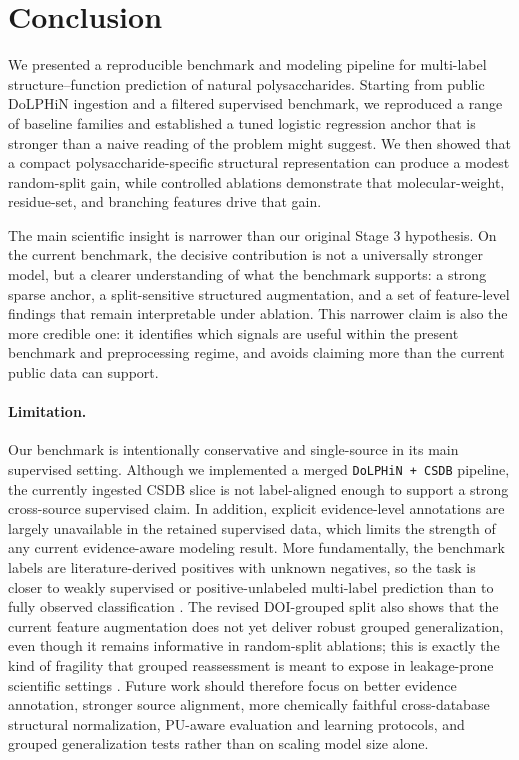 \documentclass{article}
\begin{document}
\section{Conclusion}
\label{sec:conclusion}

We presented a reproducible benchmark and modeling pipeline for multi-label structure--function prediction of natural polysaccharides. Starting from public DoLPHiN ingestion and a filtered supervised benchmark, we reproduced a range of baseline families and established a tuned logistic regression anchor that is stronger than a naive reading of the problem might suggest. We then showed that a compact polysaccharide-specific structural representation can produce a modest random-split gain, while controlled ablations demonstrate that molecular-weight, residue-set, and branching features drive that gain.

The main scientific insight is narrower than our original Stage 3 hypothesis. On the current benchmark, the decisive contribution is not a universally stronger model, but a clearer understanding of what the benchmark supports: a strong sparse anchor, a split-sensitive structured augmentation, and a set of feature-level findings that remain interpretable under ablation. This narrower claim is also the more credible one: it identifies which signals are useful within the present benchmark and preprocessing regime, and avoids claiming more than the current public data can support.

\paragraph{Limitation.}
Our benchmark is intentionally conservative and single-source in its main supervised setting. Although we implemented a merged \texttt{DoLPHiN + CSDB} pipeline, the currently ingested CSDB slice is not label-aligned enough to support a strong cross-source supervised claim. In addition, explicit evidence-level annotations are largely unavailable in the retained supervised data, which limits the strength of any current evidence-aware modeling result. More fundamentally, the benchmark labels are literature-derived positives with unknown negatives, so the task is closer to weakly supervised or positive-unlabeled multi-label prediction than to fully observed classification \cite{li2022pu}. The revised DOI-grouped split also shows that the current feature augmentation does not yet deliver robust grouped generalization, even though it remains informative in random-split ablations; this is exactly the kind of fragility that grouped reassessment is meant to expose in leakage-prone scientific settings \cite{kapoor2023leakage}. Future work should therefore focus on better evidence annotation, stronger source alignment, more chemically faithful cross-database structural normalization, PU-aware evaluation and learning protocols, and grouped generalization tests rather than on scaling model size alone.
\end{document}
